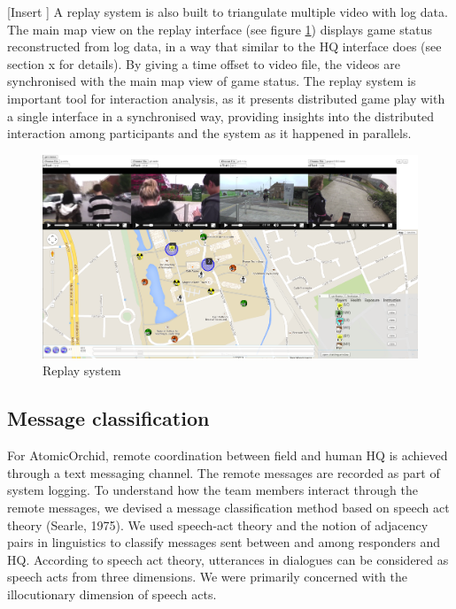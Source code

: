 [Insert ]
A replay system is also built to triangulate multiple video with log data. The main map view on the replay interface (see figure \ref{fig:replay}) displays game status reconstructed from log data, in a way that similar to the HQ interface does (see section x for details). By giving a time offset to video file, the videos are synchronised with the main map view of game status. The replay system is important tool for interaction analysis, as it presents distributed game play with a single interface in a synchronised way, providing insights into the distributed interaction among participants and the system as it happened in parallels. \\

\begin{figure}[h]
  \centering
  \includegraphics[width=1\textwidth]{img/methodology/replay}
  \caption{Replay system}
  \label{fig:replay}
\end{figure}

\subsection{Message classification} 
For AtomicOrchid, remote coordination between field and human HQ is achieved through a text messaging channel. The remote messages are recorded as part of system logging. To understand how the team members interact through the remote messages, we devised a message classification method based on speech act theory (Searle, 1975). We used speech-act theory and the notion of adjacency pairs in linguistics to classify messages sent between and among responders and HQ. According to speech act theory, utterances in dialogues can be considered as speech acts from three dimensions. We were primarily concerned with the illocutionary dimension of speech acts.\\

